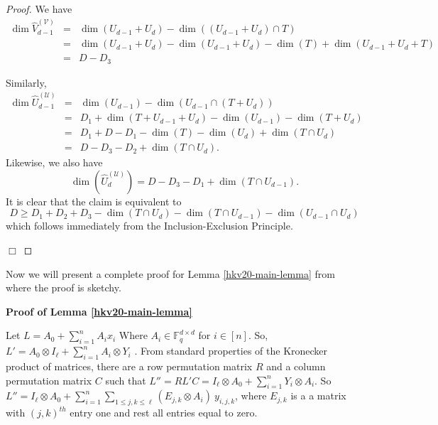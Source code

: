 \documentclass[10pt,a4paper]{article}
\newenvironment{proofof}[1]{\noindent{\it Proof of #1. }} {{\qed}}
\def\qed{\hspace*{\fill} $\Box$\par\medskip}
\begin{document}
\begin{proof}
\begin{proofof}{Claim}
We have 
\begin{eqnarray*}
\dim \hat{V}_{d-1}^{(\mathcal{V})} &=& \dim (U_{d-1}+U_d)-\dim ((U_{d-1}+U_d) \cap T)\\
&=&\dim (U_{d-1}+U_d)-\dim (U_{d-1}+U_d)-\dim (T) + \dim (U_{d-1}+U_d+T)\\
&=& D-D_3
\end{eqnarray*}

%
%
%
%

Similarly,
\begin{eqnarray*}
\dim  \hat{U}_{d-1}^{(\mathcal{U})}  &=& \dim (U_{d-1}) - \dim (U_{d-1} \cap (T+ U_d))\\
&=&D_1 + \dim (T+U_{d-1}+U_d)- \dim (U_{d-1}) - \dim (T+U_d)\\
&=&D_1 +D -D_1- \dim (T)-\dim (U_d)+\dim (T \cap U_d)\\
&=& D-D_3-D_2 + \dim(T \cap U_d). 
\end{eqnarray*}
Likewise, we also have
\[
\dim ( \hat{U}_{d}^{(\mathcal{U})} )=D-D_3-D_1+ \dim (T \cap U_{d-1}).
\]
It is clear that the claim is equivalent to
\[
 D \geq D_1 + D_2 + D_3 - \dim (T \cap U_d) - \dim (T \cap U_{d-1})-
 \dim (U_{d-1} \cap U_d)
 \]
which follows immediately from the Inclusion-Exclusion Principle. 
\end{proofof}
\end{proof}

%
%
%

Now we will present a complete proof for Lemma \ref{hkv20-main-lemma}
from \cite{HKV20} where the proof is sketchy.\smallskip
 
{\bf Proof of Lemma \ref{hkv20-main-lemma} }

Let $L=A_0 + \sum_{i=1}^n A_i x_i$ Where $A_i \in \mathbb{F}_q^{d
  \times d}$ for $i \in [n]$. So, $L'= A_0 \otimes I_\ell +
\sum_{i=1}^{n} A_i \otimes Y_i$ . From standard properties of the
Kronecker product of matrices, there are a row permutation matrix $R$
and a column permutation matrix $C$ such that $L''= RL'C = I_\ell
\otimes A_0 + \sum_{i=1}^n Y_i \otimes A_i$. So $L'' = I_\ell \otimes
A_0 + \sum_{i=1}^n \sum_{1 \leq j, k \leq \ell} (E_{j,k} \otimes A_i)~
y_{i,j,k}$, where $E_{j,k}$ is a a matrix with $(j,k)^{th}$ entry one
and rest all entries equal to zero.
     
\end{document}
